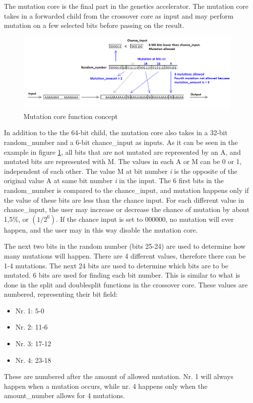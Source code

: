 The mutation core is the final part in the genetics accelerator. The mutation core takes in a forwarded child from the crossover core as input and may perform mutation on a few selected bits before passing on the result. 

\begin{figure}[H]
\includegraphics[width=\textwidth]{fpga/fig/mutation.png}
\caption{Mutation core function concept}
\label{Fig_Mutation}
\end{figure}

In addition to the the 64-bit child, the mutation core also takes in a 32-bit random\_number and a 6-bit chance\_input as inputs. As it can be seen in the example in figure \ref{Fig_Mutation}, all bits that are not mutated are represented by an A, and mutated bits are represented with M. The values in each A or M can be 0 or 1, independent of each other. The value M at bit number \emph{i} is the opposite of the original value A at same bit number \emph{i} in the input.
The 6 first bits in the random\_number is compared to the chance\_input, and mutation happens only if the value of these bits are less than the chance input. For each different value in chance\_input, the user may increase or decrease the chance of mutation by about 1,5\%, or $(1 / 2^6)$. If the chance input is set to 000000, no mutation will ever happen, and the user may in this way disable the mutation core.

The next two bits in the random number (bits 25-24) are used to determine how many mutations will happen. There are 4 different values, therefore there can be 1-4 mutations.
The next 24 bits are used to determine which bits are to be mutated. 6 bits are used for finding each bit number. This is similar to what is done in the split and doublesplit functions in the crossover core. These values are numbered, representing their bit field:
\begin{itemize}
\item Nr. 1: 5-0
\item Nr. 2: 11-6
\item Nr. 3: 17-12
\item Nr. 4: 23-18
\end{itemize}
These are numbered after the amount of allowed mutation. Nr. 1 will always happen when a mutation occurs, while nr. 4 happens only when the amount\_number allows for 4 mutations.

